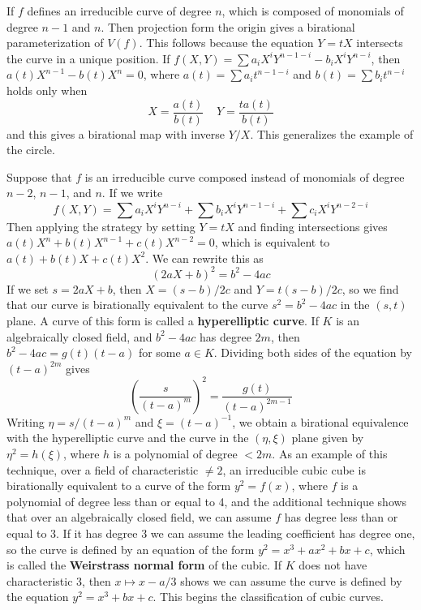 \begin{example}
    If $f$ defines an irreducible curve of degree $n$, which is composed of monomials of degree $n-1$ and $n$. Then projection form the origin gives a birational parameterization of $V(f)$. This follows because the equation $Y = tX$ intersects the curve in a unique position. If $f(X,Y) = \sum a_i X^iY^{n-1-i} - b_i X^iY^{n-i}$, then $a(t) X^{n-1} - b(t) X^n = 0$, where $a(t) = \sum a_i t^{n-1-i}$ and $b(t) = \sum b_i t^{n-i}$ holds only when
    \[  X = \frac{a(t)}{b(t)}\ \ \ \ \ Y = \frac{ta(t)}{b(t)} \]
    and this gives a birational map with inverse $Y/X$. This generalizes the example of the circle.
\end{example}

\begin{example}
    Suppose that $f$ is an irreducible curve composed instead of monomials of degree $n-2$, $n-1$, and $n$. If we write
    \[ f(X,Y) = \sum a_i X^iY^{n-i} + \sum b_i X^iY^{n-1-i} + \sum c_i X^iY^{n-2-i}  \]
    Then applying the strategy by setting $Y = tX$ and finding intersections gives $a(t) X^n + b(t) X^{n-1} + c(t) X^{n-2} = 0$, which is equivalent to $a(t) + b(t)X + c(t)X^2$. We can rewrite this as
    \[ \left( 2aX + b \right)^2 = b^2 - 4ac \]
    If we set $s = 2aX + b$, then $X = (s-b)/2c$ and $Y = t(s-b)/2c$, so we find that our curve is birationally equivalent to the curve $s^2 = b^2 - 4ac$ in the $(s,t)$ plane. A curve of this form is called a {\bf hyperelliptic curve}. If $K$ is an algebraically closed field, and $b^2 - 4ac$ has degree $2m$, then $b^2 - 4ac = g(t)(t - a)$ for some $a \in K$. Dividing both sides of the equation by $(t-a)^{2m}$ gives
    \[ \left( \frac{s}{(t-a)^m} \right)^2 = \frac{g(t)}{(t-a)^{2m-1}} \]
    Writing $\eta = s/(t-a)^m$ and $\xi = (t-a)^{-1}$, we obtain a birational equivalence with the hyperelliptic curve and the curve in the $(\eta, \xi)$ plane given by $\eta^2 = h(\xi)$, where $h$ is a polynomial of degree $< 2m$. As an example of this technique, over a field of characteristic $\neq 2$, an irreducible cubic cube is birationally equivalent to a curve of the form $y^2 = f(x)$, where $f$ is a polynomial of degree less than or equal to 4, and the additional technique shows that over an algebraically closed field, we can assume $f$ has degree less than or equal to 3. If it has degree 3 we can assume the leading coefficient has degree one, so the curve is defined by an equation of the form $y^2 = x^3 + ax^2 + bx + c$, which is called the {\bf Weirstrass normal form} of the cubic. If $K$ does not have characteristic 3, then $x \mapsto x - a/3$ shows we can assume the curve is defined by the equation $y^2 = x^3 + bx + c$. This begins the classification of cubic curves.
\end{example}

